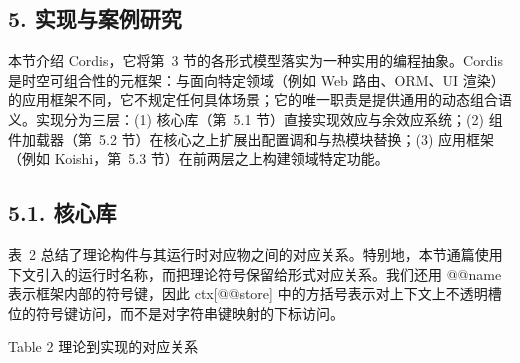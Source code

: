 \subsection{5. 实现与案例研究}\label{implementation-and-case-study}

本节介绍 Cordis，它将第~3 节的各形式模型落实为一种实用的编程抽象。Cordis 是时空可组合性的元框架：与面向特定领域（例如 Web 路由、ORM、UI 渲染）的应用框架不同，它不规定任何具体场景；它的唯一职责是提供通用的动态组合语义。实现分为三层：(1) 核心库（第~5.1 节）直接实现效应与余效应系统；(2) 组件加载器（第~5.2 节）在核心之上扩展出配置调和与热模块替换；(3) 应用框架（例如 Koishi，第~5.3 节）在前两层之上构建领域特定功能。

\subsection{5.1. 核心库}\label{core-library}

表~2 总结了理论构件与其运行时对应物之间的对应关系。特别地，本节通篇使用下文引入的运行时名称，而把理论符号保留给形式对应关系。我们还用 @@name 表示框架内部的符号键，因此 ctx{[}@@store{]} 中的方括号表示对上下文上不透明槽位的符号键访问，而不是对字符串键映射的下标访问。

Table 2 \textbar{} 理论到实现的对应关系

